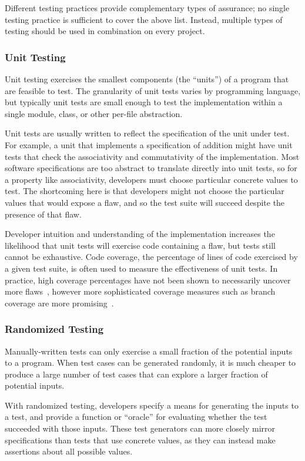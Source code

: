 Different testing practices provide complementary types of assurance;
no single testing practice is sufficient to cover the above
list. Instead, multiple types of testing should be used in
combination on every project.

\subsubsection{Unit Testing}

Unit testing exercises the smallest components (the ``units'') of a
program that are feasible to test. The granularity of unit tests
varies by programming language, but typically unit tests are small
enough to test the implementation within a single module, class, or
other per-file abstraction.

Unit tests are usually written to reflect the specification of the
unit under test. For example, a unit that implements a specification
of addition might have unit tests that check the associativity and
commutativity of the implementation. Most software specifications are
too abstract to translate directly into unit tests, so for a property
like associativity, developers must choose particular concrete values
to test. The shortcoming here is that developers might not choose the
particular values that would expose a flaw, and so the test suite
will succeed despite the presence of that flaw.

Developer intuition and understanding of the implementation increases
the likelihood that unit tests will exercise code containing a flaw,
but tests still cannot be exhaustive. Code coverage, the percentage of
lines of code exercised by a given test suite, is often used to
measure the effectiveness of unit tests. In practice, high coverage
percentages have not been shown to necessarily uncover more
flaws~\cite{inozemtseva2014coverage}, however more sophisticated
coverage measures such as branch coverage are more
promising~\cite{gligoric2013comparing}.

\subsubsection{Randomized Testing}

Manually-written tests can only exercise a small fraction of the
potential inputs to a program. When test cases can be generated
randomly, it is much cheaper to produce a large number of test cases
that can explore a larger fraction of potential inputs.

With randomized testing, developers specify a means for generating the
inputs to a test, and provide a function or ``oracle'' for evaluating
whether the test succeeded with those inputs. These test generators
can more closely mirror specifications than tests that use concrete
values, as they can instead make assertions about all possible
values.

